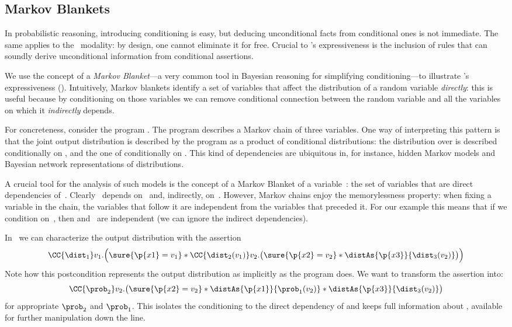 \subsection{Markov Blankets}
\label{sec:ex:markov-blanket}

In probabilistic reasoning, introducing conditioning is easy,
but deducing unconditional facts from conditional ones is not immediate.
The same applies to the \supercond\ modality: by design, one cannot eliminate it for free.
Crucial to \thelogic's expressiveness is the inclusion of rules that can
soundly derive unconditional information from conditional assertions.

We use the concept of a \emph{Markov Blanket}---a very common tool in Bayesian reasoning
  for simplifying conditioning---to illustrate \thelogic's expressiveness ().
Intuitively, Markov blankets identify a set of variables that affect the distribution of a random variable \emph{directly}:
this is useful because by conditioning on those variables
we can remove conditional connection between the random variable
and all the variables on which it \emph{indirectly} depends.


For concreteness, consider the program
.
The program describes a Markov chain of three variables.
One way of interpreting this pattern is that the joint output distribution
is described by the program as a product of conditional distributions:
the distribution over  is described conditionally on ,
and the one of  conditionally on .
This kind of dependencies are ubiquitous in, for instance, hidden Markov models and Bayesian network representations of distributions.

A crucial tool for the analysis of such models is the concept of a
Markov Blanket of a variable~: the set of variables that are direct dependencies of~.
Clearly~ depends on~ and, indirectly, on~.
However, Markov chains enjoy the memorylessness property:
when fixing a variable in the chain, the variables that follow it are independent from the variables that preceded it.
For our example this means that if we condition on~, then
 and~ are independent (\ie we can ignore the indirect dependencies).

In \thelogic\ we can characterize the output distribution with the assertion
\[
  \CC{\dist_1} v_1. \Bigl(
    \sure{\p{x1}=v_1} *
    \CC{\dist_2(v_1)} v_2. \bigl(
      \sure{\p{x2}=v_2} *
      \distAs{\p{x3}}{\dist_3(v_2)}
    \bigr)
  \Bigr)
\]
Note how this postcondition represents the output distribution
as implicitly as the program does.
We want to transform the assertion into:
\[
  \CC{\prob_2} v_2.
  \bigl(
    \sure{\p{x2}=v_2} *
    \distAs{\p{x1}}{\prob_1(v_2)} *
    \distAs{\p{x3}}{\dist_3(v_2)}
  \bigr)
\]
for appropriate $\prob_2$ and $\prob_1$.
This isolates the conditioning to the direct dependency of 
and keeps full information about ,
available for further manipulation down the line.

